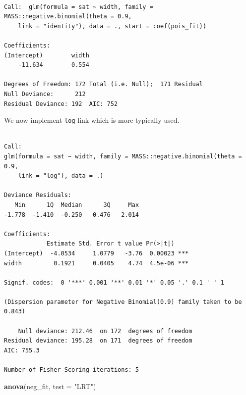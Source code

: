 \documentclass[]{book}
\newenvironment{Shaded}{\begin{snugshade}}{\end{snugshade}}
\newcommand{\DataTypeTok}[1]{\textcolor[rgb]{0.13,0.29,0.53}{#1}}
\newcommand{\FloatTok}[1]{\textcolor[rgb]{0.00,0.00,0.81}{#1}}
\newcommand{\KeywordTok}[1]{\textcolor[rgb]{0.13,0.29,0.53}{\textbf{#1}}}
\newcommand{\NormalTok}[1]{#1}
\newcommand{\OperatorTok}[1]{\textcolor[rgb]{0.81,0.36,0.00}{\textbf{#1}}}
\newcommand{\StringTok}[1]{\textcolor[rgb]{0.31,0.60,0.02}{#1}}
\begin{document}
\begin{verbatim}

Call:  glm(formula = sat ~ width, family = MASS::negative.binomial(theta = 0.9, 
    link = "identity"), data = ., start = coef(pois_fit))

Coefficients:
(Intercept)        width  
    -11.634        0.554  

Degrees of Freedom: 172 Total (i.e. Null);  171 Residual
Null Deviance:      212 
Residual Deviance: 192  AIC: 752
\end{verbatim}

We now implement \texttt{log} link which is more typically used.

\begin{Shaded}
\end{Shaded}

\begin{verbatim}

Call:
glm(formula = sat ~ width, family = MASS::negative.binomial(theta = 0.9, 
    link = "log"), data = .)

Deviance Residuals: 
   Min      1Q  Median      3Q     Max  
-1.778  -1.410  -0.250   0.476   2.014  

Coefficients:
            Estimate Std. Error t value Pr(>|t|)    
(Intercept)  -4.0534     1.0779   -3.76  0.00023 ***
width         0.1921     0.0405    4.74  4.5e-06 ***
---
Signif. codes:  0 '***' 0.001 '**' 0.01 '*' 0.05 '.' 0.1 ' ' 1

(Dispersion parameter for Negative Binomial(0.9) family taken to be 0.843)

    Null deviance: 212.46  on 172  degrees of freedom
Residual deviance: 195.28  on 171  degrees of freedom
AIC: 755.3

Number of Fisher Scoring iterations: 5
\end{verbatim}

\begin{Shaded}
\begin{Highlighting}[]
\KeywordTok{anova}\NormalTok{(neg_fit, }\DataTypeTok{test =} \StringTok{"LRT"}\NormalTok{)}
\end{Highlighting}
\end{Shaded}
\end{document}
